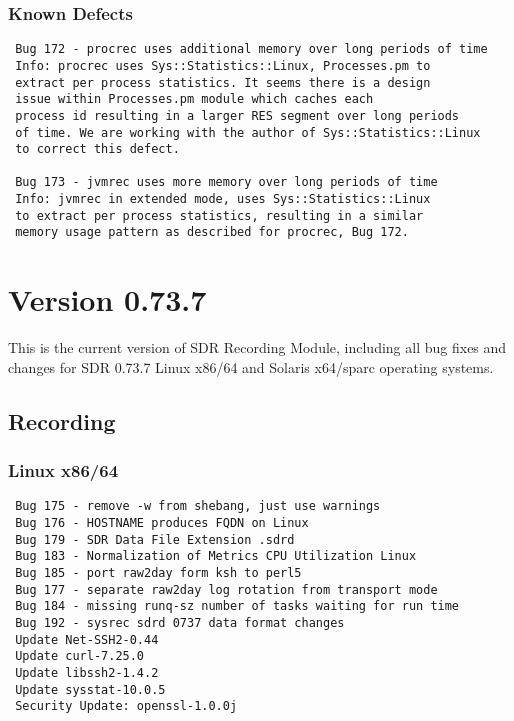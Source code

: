 \subsubsection*{Known Defects}
\begin{verbatim}
 Bug 172 - procrec uses additional memory over long periods of time
 Info: procrec uses Sys::Statistics::Linux, Processes.pm to
 extract per process statistics. It seems there is a design
 issue within Processes.pm module which caches each
 process id resulting in a larger RES segment over long periods 
 of time. We are working with the author of Sys::Statistics::Linux
 to correct this defect.

 Bug 173 - jvmrec uses more memory over long periods of time
 Info: jvmrec in extended mode, uses Sys::Statistics::Linux
 to extract per process statistics, resulting in a similar 
 memory usage pattern as described for procrec, Bug 172.
\end{verbatim}


\section{Version 0.73.7}
\noindent
This is the current version of SDR Recording Module, including all bug 
fixes and changes for SDR 0.73.7 Linux x86/64 and Solaris x64/sparc 
operating systems. 

\subsection*{Recording}

\subsubsection*{Linux x86/64}
\begin{verbatim}
 Bug 175 - remove -w from shebang, just use warnings
 Bug 176 - HOSTNAME produces FQDN on Linux
 Bug 179 - SDR Data File Extension .sdrd
 Bug 183 - Normalization of Metrics CPU Utilization Linux
 Bug 185 - port raw2day form ksh to perl5
 Bug 177 - separate raw2day log rotation from transport mode
 Bug 184 - missing runq-sz number of tasks waiting for run time
 Bug 192 - sysrec sdrd 0737 data format changes
 Update Net-SSH2-0.44
 Update curl-7.25.0
 Update libssh2-1.4.2
 Update sysstat-10.0.5
 Security Update: openssl-1.0.0j
\end{verbatim}

